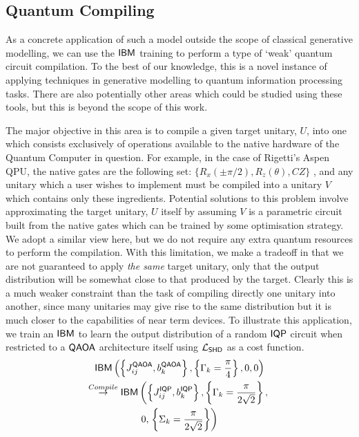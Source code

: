 \subsection*{Quantum Compiling}
As a concrete application of such a model outside the scope of classical generative modelling, we can use the $\textsf{IBM}$ training to perform a type of `weak' quantum circuit compilation. To the best of our knowledge, this is a novel instance of applying techniques in generative modelling to quantum information processing tasks. There are also potentially other areas which could be studied using these tools, but this is beyond the scope of this work.

The major objective in this area is to compile a given target unitary, $U$, into one which consists exclusively of operations available to the native hardware of the Quantum Computer in question. For example, in the case of Rigetti's Aspen QPU, the native gates are the following set: $\{R_x(\pm \pi/2), R_z(\theta), CZ\}$ \cite{smith_practical_2016, khatri_quantum-assisted_2018}, and any unitary which a user wishes to implement must be compiled into a unitary $V$ which contains only these ingredients. Potential solutions to this problem\cite{jones_quantum_2018, khatri_quantum-assisted_2018} involve approximating the target unitary, $U$ itself by assuming $V$ is a parametric circuit built from the native gates which can be trained by some optimisation strategy. We adopt a similar view here, but we do not require any extra quantum resources to perform the compilation. With this limitation, we make a tradeoff in that we are not guaranteed to apply \textit{the same} target unitary, only that the output distribution will be somewhat close to that produced by the target. Clearly this is a much weaker constraint than the task of compiling directly one unitary into another, since many unitaries may give rise to the same distribution but it is much closer to the capabilities of near term devices. To illustrate this application, we train an $\textsf{IBM}$ to learn the output distribution of a random $\operatorname{\textsf{IQP}}$ circuit when restricted to a $\operatorname{\textsf{QAOA}}$ architecture itself using $\mathcal{L}_{\operatorname{\textsf{SHD}}}$ as a cost function.
\begin{multline}
    \textsf{IBM}\left(\left\{J^{\operatorname{\textsf{QAOA}}}_{ij}, b^{\operatorname{\textsf{QAOA}}}_k\right\}, \left\{\Gamma_k = \frac{\pi}{4}\right\}, 0,  0\right) \\
    \overset{Compile}{\rightarrow}   \textsf{IBM}\left(\left\{J^{\operatorname{\textsf{IQP}}}_{ij}, b^{\operatorname{\textsf{IQP}}}_k\right\}, \left\{\Gamma_k = \frac{\pi}{2\sqrt{2}}\right\}, \right.\\0, \left.\left\{\Sigma_k = \frac{\pi}{2\sqrt{2}}\right\}\right)
\end{multline}

